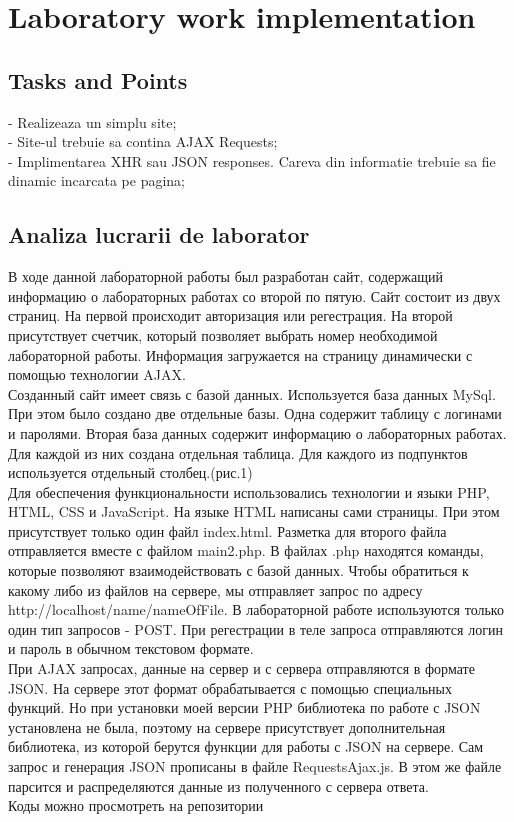 \section{Laboratory work implementation}

\subsection{Tasks and Points}

- Realizeaza un simplu site; \\
\indent 
- Site-ul trebuie sa contina AJAX Requests; \\
\indent 
- Implimentarea XHR sau JSON responses. Careva din informatie trebuie sa fie dinamic incarcata pe pagina;

\subsection{Analiza lucrarii de laborator}
В ходе данной лабораторной работы был разработан сайт, содержащий информацию о лабораторных работах со второй по пятую. Сайт состоит из двух страниц. На первой происходит авторизация или регестрация. На второй присутствует счетчик, который позволяет выбрать номер необходимой лабораторной работы. Информация загружается на страницу динамически с помощью технологии AJAX.\\
\indent 
Созданный сайт имеет связь с базой данных. Используется база данных MySql. При этом было создано две отдельные базы. Одна содержит таблицу с логинами и паролями. Вторая база данных содержит информацию о лабораторных работах. Для каждой из них создана отдельная таблица. Для каждого из подпунктов используется отдельный столбец.(рис.1)\\
\indent 
Для обеспечения функциональности использовались технологии и языки PHP, HTML, CSS и JavaScript. На языке HTML написаны сами страницы. При этом присутствует только один файл index.html. Разметка для второго файла отправляется вместе с файлом main2.php. В файлах .php находятся команды, которые позволяют взаимодействовать с базой данных. Чтобы обратиться к какому либо из файлов на сервере, мы отправляет запрос по адресу http://localhost/name/nameOfFile. В лабораторной работе используются только один тип запросов - POST. При регестрации в теле запроса отправляются логин и пароль в обычном текстовом формате. \\
\indent 
При AJAX запросах, данные на сервер и с сервера отправляются в формате JSON. На сервере этот формат обрабатывается с помощью специальных функций. Но при установки моей версии PHP библиотека по работе с JSON установлена не была, поэтому на сервере присутствует дополнительная библиотека, из которой берутся функции для работы с JSON на сервере. Сам запрос и генерация JSON прописаны в файле RequestsAjax.js. В этом же файле парсится и распределяются данные из полученного с сервера ответа.\\
\indent 
Коды можно просмотреть на репозитории 



